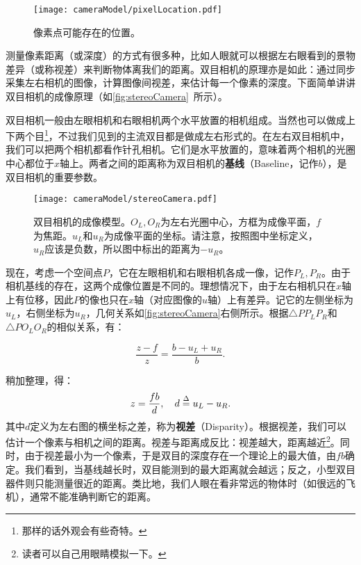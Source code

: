 \begin{figure}[!ht]
	\centering
	\texttt{[image: cameraModel/pixelLocation.pdf]}
	\caption{像素点可能存在的位置。}
	\label{fig:pixelLocation}
\end{figure}

测量像素距离（或深度）的方式有很多种，比如人眼就可以根据左右眼看到的景物差异（或称视差）来判断物体离我们的距离。双目相机的原理亦是如此：通过同步采集左右相机的图像，计算图像间视差，来估计每一个像素的深度。下面简单讲讲双目相机的成像原理（如\autoref{fig:stereoCamera}~所示）。

双目相机一般由左眼相机和右眼相机两个水平放置的相机组成。当然也可以做成上下两个目\footnote{那样的话外观会有些奇特。}，不过我们见到的主流双目都是做成左右形式的。在左右双目相机中，我们可以把两个相机都看作针孔相机。它们是水平放置的，意味着两个相机的光圈中心都位于$x$轴上。两者之间的距离称为双目相机的\textbf{基线}（Baseline，记作$b$），是双目相机的重要参数。

\begin{figure}[!ht]
	\centering
	\texttt{[image: cameraModel/stereoCamera.pdf]}
	\caption{双目相机的成像模型。$O_L,O_R$为左右光圈中心，方框为成像平面，$f$为焦距。$u_L$和$u_R$为成像平面的坐标。请注意，按照图中坐标定义，$u_R$应该是负数，所以图中标出的距离为$-u_R$。}
	\label{fig:stereoCamera}
\end{figure}

现在，考虑一个空间点$P$，它在左眼相机和右眼相机各成一像，记作$P_L, P_R$。由于相机基线的存在，这两个成像位置是不同的。理想情况下，由于左右相机只在$x$轴上有位移，因此$P$的像也只在$x$轴（对应图像的$u$轴）上有差异。记它的左侧坐标为$u_L$，右侧坐标为$u_R$，几何关系如\autoref{fig:stereoCamera}右侧所示。根据$\triangle PP_LP_R$和$\triangle PO_LO_R$的相似关系，有：

\begin{equation}
\frac{{z - f}}{z} = \frac{{b - {u_L} + {u_R}}}{b}.
\end{equation}

稍加整理，得：
\begin{equation}
z = \frac{{fb}}{d}, \quad d \buildrel \Delta \over = {u_L} - {u_R}.
\end{equation}
其中$d$定义为左右图的横坐标之差，称为\textbf{视差}（Disparity）。根据视差，我们可以估计一个像素与相机之间的距离。视差与距离成反比：视差越大，距离越近\footnote{读者可以自己用眼睛模拟一下。}。同时，由于视差最小为一个像素，于是双目的深度存在一个理论上的最大值，由$fb$确定。我们看到，当基线越长时，双目能测到的最大距离就会越远；反之，小型双目器件则只能测量很近的距离。类比地，我们人眼在看非常远的物体时（如很远的飞机），通常不能准确判断它的距离。

